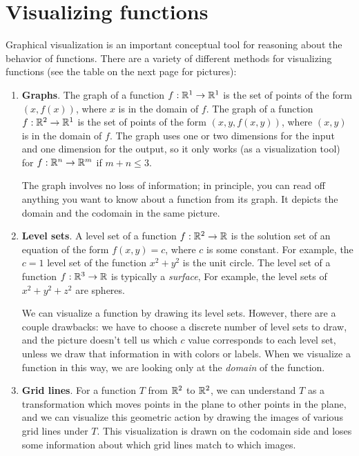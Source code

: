 \documentclass[svgnames]{watsonbook}
\begin{document}
\newpage

\section{Visualizing functions}

  Graphical visualization is an important conceptual tool for reasoning
  about the behavior of functions. There are a variety of different
  methods for visualizing functions (see the table on the next page
  for pictures):

  \begin{tcolorbox}[title = Function Visualization Methods, colback =
    softblue, colframe = MidnightBlue] 
  \begin{enumerate}[leftmargin = 12pt, itemsep = 6pt, parsep = 6pt]
  \item \textbf{Graphs}. The graph of a function $f : \mathbb{R}^1 \to \mathbb{R}^1$ is
    the set of points of the form $(x,f(x))$, where $x$ is in the
    domain of $f$. The graph of a function $f : \mathbb{R}^2 \to \mathbb{R}^1$ is
    the set of points of the form $(x,y,f(x,y))$, where $(x,y)$ is in the
    domain of $f$. The graph uses one or two dimensions for the input
    and one dimension for the output, so it only works (as a
    visualization tool) for $f : \mathbb{R}^n \to \mathbb{R}^m$ if $m + n \leq 3$.

    The graph involves no loss of information; in principle, you can
    read off anything you want to know about a function from its
    graph. It depicts the domain and the codomain in the same picture. 
    
  \item \textbf{Level sets}. A level set of a function $f:\mathbb{R}^2 \to \mathbb{R}$
    is the solution set of an equation of the form $f(x,y) = c$, where
    $c$ is some constant. For example, the $c=1$ level set of the
    function $x^2 + y^2$ is the unit circle. The level set of a
    function $f:\mathbb{R}^3 \to \mathbb{R}$ is typically a \textit{surface}, For
    example, the level sets of $x^2 + y^2 + z^2$ are spheres.

    We can visualize a function by drawing its level sets. However,
    there are a couple drawbacks: we have to choose a discrete number
    of level sets to draw, and the picture doesn't tell us which $c$
    value corresponds to each level set, unless we draw that
    information in with colors or labels. When we visualize a function
    in this way, we are looking only at the \textit{domain} of the
    function. 

  \item \textbf{Grid lines}. For a function $T$ from $\mathbb{R}^2$ to $\mathbb{R}^2$, we can
    understand $T$ as a transformation which moves points in the plane
    to other points in the plane, and we can visualize this geometric
    action by drawing the images of various grid lines under $T$. This
    visualization is drawn on the codomain side and loses some
    information about which grid lines match to which images. 
    

\end{enumerate}
\end{tcolorbox}
\end{document}
